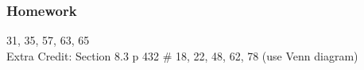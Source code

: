 \documentclass[14pt]{extarticle}
\begin{document}
\subsubsection*{Homework}
31, 35, 57, 63, 65
\\
Extra Credit: Section 8.3 p 432 \# 18, 22, 48, 62, 78 (use Venn diagram)




\cleardoublepage
\end{document}
